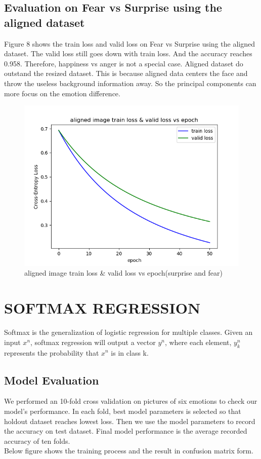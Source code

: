 \documentclass{article} %
\begin{document}
\subsection {Evaluation on Fear vs Surprise using the aligned dataset}
Figure 8 shows the train loss and valid loss on Fear vs Surprise using the aligned dataset. The valid loss still goes down with train loss. And the accuracy reaches 0.958. Therefore, happiness vs anger is not a special case. Aligned dataset do outstand the resized dataset. This is because aligned data centers the face and throw the useless background information away. So the principal components can more focus on the emotion difference.
\begin{figure}[h]
	\centering
	\includegraphics[scale=0.5]{./graph/aligned_angerfear.png}
	\caption{aligned image train loss \& valid loss vs epoch(surprise and fear)}
\end{figure}

\section{SOFTMAX REGRESSION}
Softmax is the generalization of logistic regression for multiple classes. Given an input $x^n$, softmax regression will output a vector $y^n$, where each element, $y_k^n$ represents the probability that $x^n$ is in class k.
\subsection {Model Evaluation}
We performed an 10-fold cross validation on pictures of six emotions to check our model's performance. In each fold, best model parameters is selected so that holdout dataset reaches lowest loss. Then we use the model parameters to record the accuracy on test dataset. Final model performance is the average recorded accuracy of ten folds. \\
Below figure shows the training process and the result in confusion matrix form.
\end{document}
